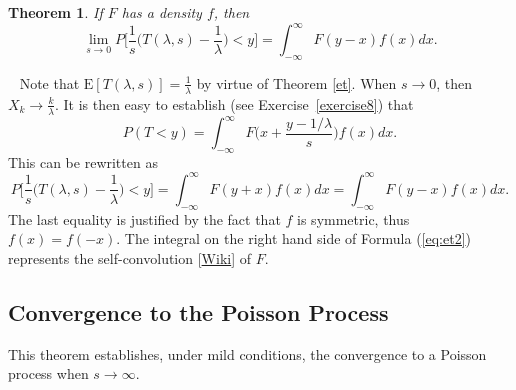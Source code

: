 \documentclass[10pt]{article}
\newtheorem{theorem}{Theorem}[section]
\newenvironment{proof}[1][Proof]{\begin{trivlist}
\item[\hskip \labelsep {\bfseries #1}]}{\end{trivlist}}
\newcommand{\qed}{\nobreak \ifvmode \relax \else
      \ifdim\lastskip<1.5em \hskip-\lastskip
      \hskip1.5em plus0em minus0.5em \fi \nobreak
      \vrule height0.75em width0.5em depth0.25em\fi}
\begin{document}
\begin{theorem}
\label{et2}
If  $F$ has a density $f$, then
\begin{equation}
   \lim_{s\rightarrow 0} P\Big[\frac{1}{s}\Big(T(\lambda,s)-\frac{1}{\lambda}\Big)<y\Big] = \int_{-\infty}^{\infty} F(y-x)f(x)dx.\label{eq:et2}
\end{equation}
\end{theorem}
\begin{proof}
$ $ \newline \
Note that $\mbox{E}[T(\lambda,s)]=\frac{1}{\lambda}$ by virtue of Theorem \ref{et}. When $s\rightarrow 0$, then $X_k\rightarrow \frac{k}{\lambda}$. It is then easy to establish (see Exercise~\ref{exercise8}) that
$$P(T<y)=\int_{-\infty}^\infty F\Big(x+\frac{y-1/\lambda}{s}\Big)f(x)dx.$$
 This can be rewritten as
$$ P\Big[\frac{1}{s}\Big(T(\lambda,s)-\frac{1}{\lambda}\Big)<y\Big] =\int_{-\infty}^{\infty} F(y+x)f(x)dx = \int_{-\infty}^{\infty} F(y-x)f(x)dx.$$
The last equality is justified by the fact that $f$ is symmetric, thus $f(x)=f(-x)$. The integral on the right hand side of Formula (\ref{eq:et2}) represents the \textcolor{index}{self-convolution}
[\href{https://en.wikipedia.org/wiki/Convolution_of_probability_distributions}{Wiki}] of $F$. \qed
\end{proof}

\subsection{Convergence to the Poisson Process}\label{convpp}

This theorem establishes, under mild conditions, the convergence to a \textcolor{index}{Poisson process} when $s\rightarrow\infty$.
\end{document}
